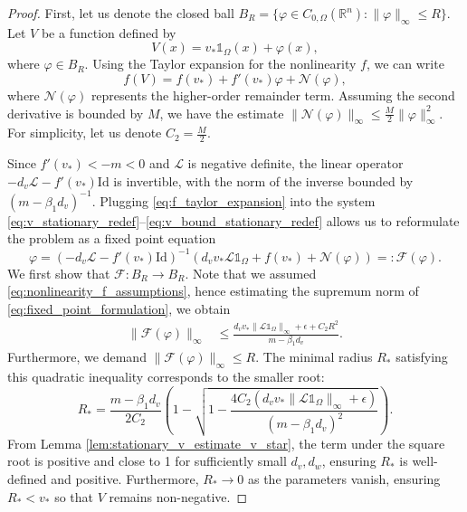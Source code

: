 \documentclass[preprint,12pt]{elsarticle}
\theoremstyle{plain}
\theoremstyle{definition}
\theoremstyle{remark}
\begin{document}
\begin{proof}
    First, let us denote the closed ball $B_R = \{ \varphi \in C_{0, \Omega}(\mathbb{R}^n) : \|\varphi\|_\infty \leq R \}$. 
    Let $V$ be a function defined by
    \begin{equation}
        \label{eq:stationary_u_definition}
        V(x) = v_* \mathds{1}_{\Omega}(x) + \varphi(x),
    \end{equation}
    where $\varphi \in B_R$. Using the Taylor expansion for the nonlinearity $f$, we can write
    \begin{equation}
        \label{eq:f_taylor_expansion}
        f(V) = f(v_*) + f'(v_*) \varphi + \mathcal{N}(\varphi),
    \end{equation}
    where $\mathcal{N}(\varphi)$ represents the higher-order remainder term. Assuming the second derivative is bounded by $M$, we have the estimate $\|\mathcal{N}(\varphi)\|_\infty \leq \frac{M}{2} \|\varphi\|_\infty^2$. For simplicity, let us denote $C_2 = \frac{M}{2}$.
    
    Since $f'(v_*) < -m < 0$ and $\mathcal{L}$ is negative definite, the linear operator $-d_v \mathcal{L} - f'(v_*) \mathrm{Id}$ is invertible, with the norm of the inverse bounded by $(m - \beta_1 d_v)^{-1}$. Plugging \eqref{eq:f_taylor_expansion} into the system \eqref{eq:v_stationary_redef}--\eqref{eq:v_bound_stationary_redef} allows us to reformulate the problem as a fixed point equation
    \begin{equation}
        \label{eq:fixed_point_formulation}
        \varphi = \left( -d_v \mathcal{L} - f'(v_*) \mathrm{Id} \right)^{-1} \left( d_v v_* \mathcal{L} \mathds{1}_\Omega + f(v_*) + \mathcal{N}(\varphi) \right) =: \mathcal{F}(\varphi).
    \end{equation}
    We first show that $\mathcal{F}: B_R \to B_R$. Note that we assumed \eqref{eq:nonlinearity_f_assumptions}, hence estimating the supremum norm of \eqref{eq:fixed_point_formulation}, we obtain
    \begin{align}
        \label{eq:f_ball_to_ball_condition_1}
        \| \mathcal{F}(\varphi) \|_\infty 
        &\leq
        \frac{d_v v_* \|\mathcal{L}\mathds{1}_\Omega\|_\infty + \epsilon + C_2 R^2}{m - \beta_1 d_v}.
    \end{align}
    Furthermore, we demand $\|\mathcal{F}(\varphi)\|_\infty \leq R$. The minimal radius $R_*$ satisfying this quadratic inequality corresponds to the smaller root:
    \begin{equation}
        \label{eq:f_ball_to_ball_radius}
        R_* = \frac{m - \beta_1 d_v}{2 C_2}
        \left(1 - 
        \sqrt{ 
        1 
        -
        \frac{4 C_2 (d_v v_* \|\mathcal{L}\mathds{1}_\Omega\|_\infty + \epsilon)}{(m - \beta_1 d_v)^2}
        }
        \right).
    \end{equation}
    From Lemma \ref{lem:stationary_v_estimate_v_star}, the term under the square root is positive and close to 1 for sufficiently small $d_v, d_w$, ensuring $R_*$ is well-defined and positive. Furthermore, $R_* \to 0$ as the parameters vanish, ensuring $R_* < v_*$ so that $V$ remains non-negative.


\end{proof}
\end{document}
